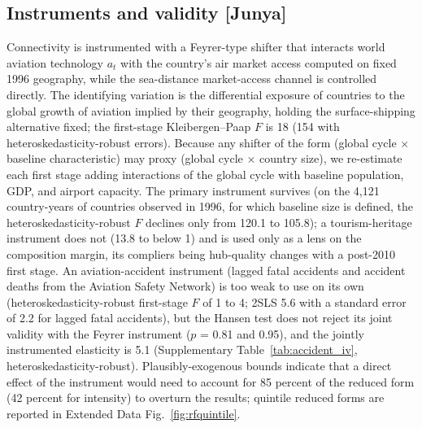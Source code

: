 \documentclass[12pt]{extarticle}
\begin{document}
\subsection*{Instruments and validity [Junya]}
Connectivity is instrumented with a Feyrer-type shifter that interacts
world aviation technology $a_t$ with the country's air market access
computed on fixed 1996 geography, while the sea-distance market-access
channel is controlled directly. The identifying variation is the
differential exposure of countries to the global growth of aviation implied
by their geography, holding the surface-shipping alternative fixed; the
first-stage Kleibergen--Paap $F$ is 18 (154 with heteroskedasticity-robust
errors). Because any shifter of the form
(global cycle $\times$ baseline characteristic) may proxy (global cycle
$\times$ country size), we re-estimate each first stage adding interactions
of the global cycle with baseline population, GDP, and airport capacity.
The primary instrument survives (on the 4,121 country-years of countries
observed in 1996, for which baseline size is defined, the
heteroskedasticity-robust $F$ declines only from 120.1 to 105.8);
a tourism-heritage instrument does not (13.8 to below 1) and is used only
as a lens on the composition margin, its compliers being hub-quality
changes with a post-2010 first stage. An aviation-accident instrument
(lagged fatal accidents and accident deaths from the Aviation Safety
Network) is too weak to use on its own (heteroskedasticity-robust
first-stage $F$ of 1 to 4; 2SLS 5.6 with a standard error of 2.2 for
lagged fatal accidents), but the Hansen test does not reject its joint
validity with the Feyrer instrument ($p$ = 0.81 and 0.95), and the jointly
instrumented elasticity is 5.1 (Supplementary
Table~\ref{tab:accident_iv}, heteroskedasticity-robust). Plausibly-exogenous bounds indicate that a direct
effect of the instrument would need to account for 85 percent of the
reduced form (42 percent for intensity) to overturn the results; quintile
reduced forms are reported in Extended Data Fig.~\ref{fig:rfquintile}.
\end{document}
